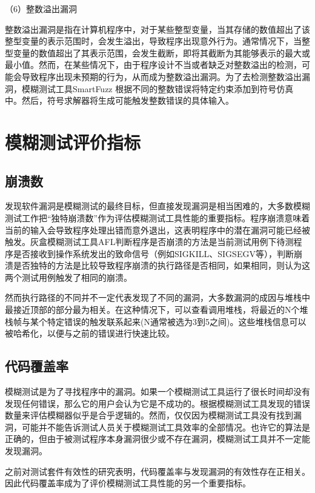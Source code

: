 \documentclass[master]{thesis-uestc}
\begin{document}
（6）整数溢出漏洞

整数溢出漏洞是指在计算机程序中，对于某些整型变量，当其存储的数值超出了该整型变量的表示范围时，会发生溢出，导致程序出现意外行为。通常情况下，当整型变量的数值超出了其表示范围，会发生截断，即将其截断为其能够表示的最大或最小值。然而，在某些情况下，由于程序设计不当或者缺乏对整数溢出的检测，可能会导致程序出现未预期的行为，从而成为整数溢出漏洞。为了去检测整数溢出漏洞，模糊测试工具SmartFuzz 根据不同的整数错误将特定约束添加到符号仿真中。然后，符号求解器将生成可能触发整数错误的具体输入。

\section{模糊测试评价指标}

\subsection{崩溃数}

发现软件漏洞是模糊测试的最终目标，但直接发现漏洞是相当困难的，大多数模糊测试工作把“独特崩溃数”作为评估模糊测试工具性能的重要指标。程序崩溃意味着当前的输入会导致程序处理出错而意外退出，这表明程序中的潜在漏洞可能已经被触发。灰盒模糊测试工具AFL判断程序是否崩溃的方法是当前测试用例下待测程序是否接收到操作系统发出的致命信号（例如SIGKILL、SIGSEGV等），判断崩溃是否独特的方法是比较导致程序崩溃的执行路径是否相同，如果相同，则认为这两个测试用例触发了相同的崩溃。

然而执行路径的不同并不一定代表发现了不同的漏洞，大多数漏洞的成因与堆栈中最接近顶部的部分最为相关。在这种情况下，可以查看调用堆栈，将最近的N个堆栈帧与某个特定错误的触发联系起来(N通常被选为3到5之间)。这些堆栈信息可以被哈希化，以便与之前的错误进行快速比较。


\subsection{代码覆盖率}

模糊测试是为了寻找程序中的漏洞。如果一个模糊测试工具运行了很长时间却没有发现任何错误，那么它的用户会认为它是不成功的。根据模糊测试工具发现的错误数量来评估模糊器似乎是合乎逻辑的。然而，仅仅因为模糊测试工具没有找到漏洞，可能并不能告诉测试人员关于模糊测试工具效率的全部情况。也许它的算法是正确的，但由于被测试程序本身漏洞很少或不存在漏洞，模糊测试工具并不一定能发现漏洞。

之前对测试套件有效性的研究表明，代码覆盖率与发现漏洞的有效性存在正相关。因此代码覆盖率成为了评价模糊测试工具性能的另一个重要指标。
\end{document}
